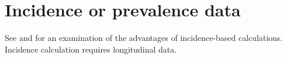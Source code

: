 \documentclass[\main/main.tex]{subfiles}
\begin{document}
\section{Incidence or prevalence data}

See \cite{murray2000} and \cite{rogers1989} for an examination of the advantages of incidence-based calculations. Incidence calculation requires longitudinal data. 
\end{document}
